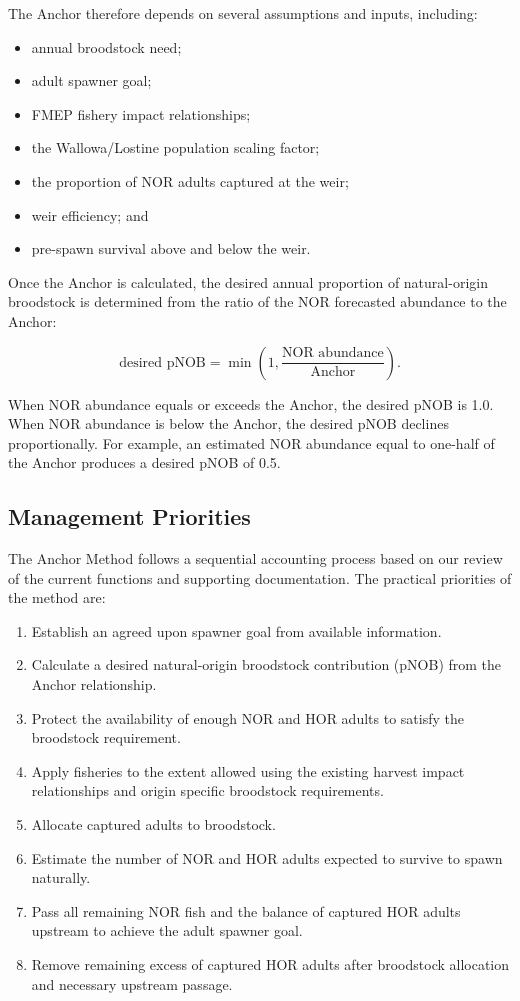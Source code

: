 \documentclass[12pt,letterpaper]{article}
\providecommand{\tightlist}{%
  \setlength{\itemsep}{0pt}\setlength{\parskip}{0pt}}
\begin{document}
The Anchor therefore depends on several assumptions and inputs, including:

\begin{itemize}
\tightlist
\item
  annual broodstock need;
\item
  adult spawner goal;
\item
  FMEP fishery impact relationships;
\item
  the Wallowa/Lostine population scaling factor;
\item
  the proportion of NOR adults captured at the weir;
\item
  weir efficiency; and
\item
  pre-spawn survival above and below the weir.
\end{itemize}

Once the Anchor is calculated, the desired annual proportion of natural-origin broodstock is determined from the ratio of the NOR forecasted abundance to the Anchor:

\[
\text{desired pNOB} =
\min\left(1,\frac{\text{NOR abundance}}{\text{Anchor}}\right).
\]

When NOR abundance equals or exceeds the Anchor, the desired pNOB is 1.0. When NOR abundance is below the Anchor, the desired pNOB declines proportionally. For example, an estimated NOR abundance equal to one-half of the Anchor produces a desired pNOB of 0.5.

\subsection{Management Priorities}\label{management-priorities}

The Anchor Method follows a sequential accounting process based on our review of the current functions and supporting documentation. The practical priorities of the method are:

\begin{enumerate}
\def\labelenumi{\arabic{enumi}.}
\tightlist
\item
  Establish an agreed upon spawner goal from available information.
\item
  Calculate a desired natural-origin broodstock contribution (pNOB) from the Anchor relationship.
\item
  Protect the availability of enough NOR and HOR adults to satisfy the broodstock requirement.
\item
  Apply fisheries to the extent allowed using the existing harvest impact relationships and origin specific broodstock requirements.
\item
  Allocate captured adults to broodstock.
\item
  Estimate the number of NOR and HOR adults expected to survive to spawn naturally.
\item
  Pass all remaining NOR fish and the balance of captured HOR adults upstream to achieve the adult spawner goal.
\item
  Remove remaining excess of captured HOR adults after broodstock allocation and necessary upstream passage.
\end{enumerate}
\end{document}
